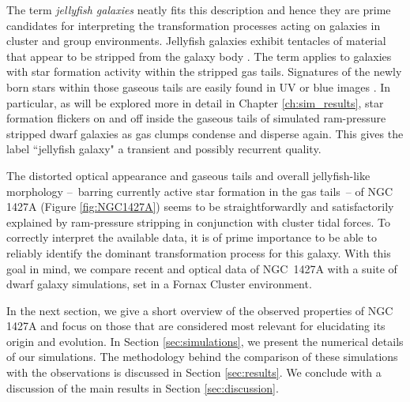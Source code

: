 The term \emph{jellyfish galaxies} \citep{Ebeling2013} neatly fits this description and hence they are prime candidates for interpreting the transformation processes acting on galaxies in cluster and group environments.
Jellyfish galaxies exhibit tentacles of material that appear to be stripped from the galaxy body \citep{Poggianti2017a, Poggianti2019b, Ramatsoku2020}.
The term applies to galaxies with star formation activity within the stripped gas tails.
Signatures of the newly born stars within those gaseous tails are easily found in UV or blue images \citep{Cortese2007,Smith2010a,Poggianti2017a}. In particular, as will be explored more in detail in Chapter \ref{ch:sim_results}, star formation flickers on and off inside the gaseous tails of simulated ram-pressure stripped dwarf galaxies as gas clumps condense and disperse again. This gives the label ``jellyfish galaxy" a transient and possibly recurrent quality.

The distorted optical appearance and gaseous tails and overall jellyfish-like morphology --~barring currently active star formation in the gas tails~-- of NGC 1427A (Figure \ref{fig:NGC1427A}) seems to be straightforwardly and satisfactorily explained by ram-pressure stripping in conjunction with cluster tidal forces.
To correctly interpret the available data, it is of prime importance to be able to reliably identify the dominant transformation process for this galaxy.
With this goal in mind, we compare recent \Hi{} and optical data of NGC~1427A with a suite of dwarf galaxy simulations, set in a Fornax Cluster environment.

In the next section, we give a short overview of the observed properties of NGC 1427A and focus on those that are considered most relevant for elucidating its origin and evolution. In Section \ref{sec:simulations}, we present the numerical details of our simulations. The methodology behind the comparison of these simulations with the observations is discussed in Section \ref{sec:results}. We conclude with a discussion of the main results in Section \ref{sec:discussion}.


